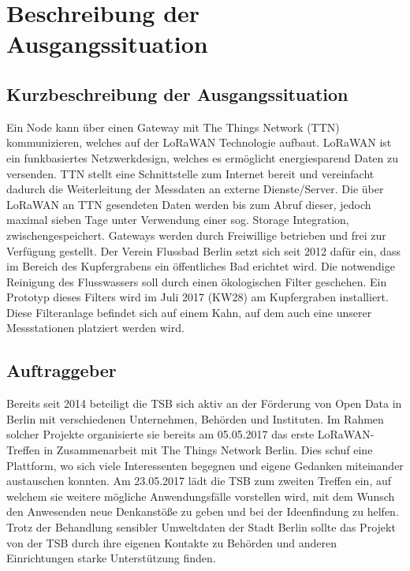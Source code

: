 \section{Beschreibung der Ausgangssituation}

\subsection{Kurzbeschreibung der Ausgangssituation}

Ein Node kann \"uber einen Gateway mit The Things Network (TTN) kommunizieren, welches auf der LoRaWAN Technologie aufbaut.
LoRaWAN ist ein funkbasiertes Netzwerkdesign, welches es ermöglicht energiesparend Daten zu versenden. TTN stellt eine Schnittstelle zum
Internet bereit und vereinfacht dadurch die Weiterleitung der Messdaten an externe Dienste/Server. Die über LoRaWAN an TTN gesendeten Daten
werden bis zum Abruf dieser, jedoch maximal sieben Tage unter Verwendung einer sog. \glqq Storage Integration\grqq, zwischengespeichert.
Gateways werden durch Freiwillige betrieben und frei zur Verfügung gestellt.\newline
Der Verein Flussbad Berlin setzt sich seit 2012 dafür ein, dass im Bereich des Kupfergrabens ein öffentliches Bad erichtet wird. Die notwendige Reinigung des Flusswassers soll durch einen ökologischen Filter geschehen. Ein Prototyp dieses Filters wird im Juli 2017 (KW28) am Kupfergraben installiert.
Diese Filteranlage befindet sich auf einem Kahn, auf dem auch eine unserer Messstationen platziert werden wird.

\subsection{Auftraggeber}

Bereits seit 2014 beteiligt die TSB sich aktiv an der Förderung von \glqq Open Data\grqq{} in Berlin mit verschiedenen Unternehmen, Behörden und Instituten.
Im Rahmen solcher Projekte organisierte sie bereits am 05.05.2017 das erste \glqq LoRaWAN-Treffen\grqq{} in Zusammenarbeit mit The Things Network Berlin. Dies schuf eine Plattform, wo sich viele Interessenten begegnen und eigene Gedanken miteinander austauschen konnten.\newline
Am 23.05.2017 lädt die TSB zum zweiten Treffen ein, auf welchem sie weitere m\"ogliche Anwendungsfälle vorstellen wird, mit dem Wunsch den Anwesenden neue Denkanstöße zu geben und bei der Ideenfindung zu helfen.\newline
Trotz der Behandlung sensibler Umweltdaten der Stadt Berlin sollte das Projekt von der TSB durch ihre eigenen Kontakte zu Behörden und anderen Einrichtungen starke Unterst\"utzung
finden.\newline

